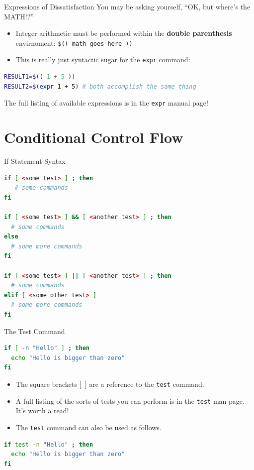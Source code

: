\documentclass[11pt]{beamer}
\begin{document}
\begin{frame}[fragile=singleslide]{Expressions of Dissatisfaction}
You may be asking yourself, ``OK, but where's the MATH!?''
\begin{itemize}
\item Integer arithmetic must be performed within the \textbf{double parenthesis} envirnoment: \texttt{\$(( math goes here ))}
\item This is really just syntactic sugar for the \texttt{expr} command:
\end{itemize}
\begin{lstlisting}[style=terminal, language=bash]
RESULT1=$(( 1 + 5 ))
RESULT2=$(expr 1 + 5) # both accomplish the same thing
\end{lstlisting}
The full listing of available expressions is in the \texttt{expr} manual page!
\end{frame}

\section[Conditionals]{Conditional Control Flow}
\begin{frame}[fragile=singleslide]{If Statement Syntax}
\begin{lstlisting}[style=terminal, language=bash]
if [ <some test> ] ; then
   # some commands
fi

if [ <some test> ] && [ <another test> ] ; then
  # some commands
else 
  # some more commands
fi

if [ <some test> ] || [ <another test> ] ; then
  # some commands
elif [ <some other test> ]
  # some more commands
fi
\end{lstlisting}
\end{frame}

\begin{frame}[fragile=singleslide]{The Test Command}
\begin{lstlisting}[style=terminal, language=bash]
if [ -n "Hello" ] ; then
  echo "Hello is bigger than zero"
fi
\end{lstlisting}
\begin{itemize}
\item The square brackets \texttt{$[$ $]$} are a reference to the \texttt{test} command.
\item A full listing of the sorts of tests you can perform is in the \texttt{test} man page.  It's worth a read! 
\item The \texttt{test} command can also be used as follows.
\end{itemize}
\begin{lstlisting}[style=terminal, language=bash]
if test -n "Hello" ; then
  echo "Hello is bigger than zero"
fi
\end{lstlisting}
\end{frame}
\end{document}
